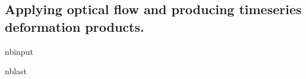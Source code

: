 \documentclass[letterpaper,10pt,english]{sphinxmanual}
\begin{document}
\subsection{Applying optical flow and producing time\sphinxhyphen{}series deformation products.}
\label{\detokenize{notebooks/MudCreek_Landslide_optical:Applying-optical-flow-and-producing-time-series-deformation-products.}}
\begin{sphinxuseclass}{nbinput}
\begin{sphinxuseclass}{nblast}
{
\begin{sphinxVerbatim}[commandchars=\\\{\}]
\llap{\color{nbsphinxin}[ ]:\,\hspace{\fboxrule}\hspace{\fboxsep}} 

 
   



\end{sphinxVerbatim}}
\end{sphinxuseclass}
\end{sphinxuseclass}
\end{document}
